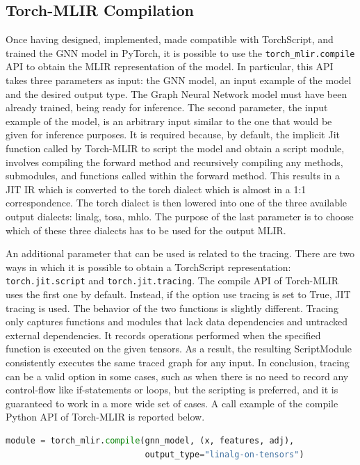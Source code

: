 \subsection{Torch-MLIR Compilation}
\label{subsec:torch-mlir-compilation}%

Once having designed, implemented, made compatible with TorchScript, and trained the GNN model in PyTorch, it is possible to use the \lstinline{torch_mlir.compile} API to obtain the MLIR representation of the model.
In particular, this API takes three parameters as input: the GNN model, an input example of the model and the desired output type.
The Graph Neural Network model must have been already trained, being ready for inference.
The second parameter, the input example of the model, is an arbitrary input similar to the one that would be given for inference purposes.
It is required because, by default, the implicit Jit function called by Torch-MLIR to script the model and obtain a script module, involves compiling the forward method and recursively compiling any methods, submodules, and functions called within the forward method. This results in a JIT IR which is converted to the torch dialect which is almost in a 1:1 correspondence.
The torch dialect is then lowered into one of the three available output dialects: linalg, tosa, mhlo.
The purpose of the last parameter is to choose which of these three dialects has to be used for the output MLIR\@.

An additional parameter that can be used is related to the tracing.
There are two ways in which it is possible to obtain a TorchScript representation: \lstinline{torch.jit.script} and \lstinline{torch.jit.tracing}.
The compile API of Torch-MLIR uses the first one by default.
Instead, if the option use tracing is set to True, JIT tracing is used.
The behavior of the two functions is slightly different.
Tracing only captures functions and modules that lack data dependencies and untracked external dependencies.
It records operations performed when the specified function is executed on the given tensors.
As a result, the resulting ScriptModule consistently executes the same traced graph for any input.
In conclusion, tracing can be a valid option in some cases, such as when there is no need to record any control-flow like if-statements or loops, but the scripting is preferred, and it is guaranteed to work in a more wide set of cases.
A call example of the compile Python API of Torch-MLIR is reported below.
\begin{lstlisting}[language=Python,label={lst:torch_mlir-compile}]
module = torch_mlir.compile(gnn_model, (x, features, adj),
                            output_type="linalg-on-tensors")
\end{lstlisting}


